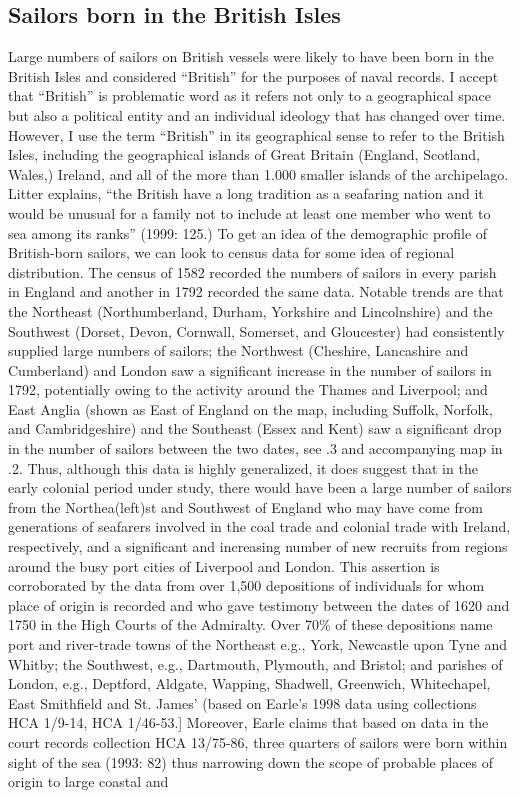 \subsection{\textbf{Sailors} \textbf{born} \textbf{in} \textbf{the} \textbf{British} \textbf{Isles} }%


Large numbers of sailors on British vessels were likely to have been born in the British Isles and considered “British” for the purposes of naval records. I accept that “British” is problematic word as it refers not only to a geographical space but also a political entity and an individual ideology that has changed over time. However, I use the term “British” in its geographical sense to refer to the British Isles, including the geographical islands of Great Britain (England, Scotland, Wales,) Ireland, and all of the more than 1.000 smaller islands of the archipelago. Litter explains, “the British have a long tradition as a seafaring nation and it would be unusual for a family not to include at least one member who went to sea among its ranks” (1999: 125.) To get an idea of the demographic profile of British-born sailors, we can look to census data for some idea of regional distribution. The census of 1582 recorded the numbers of sailors in every parish in England \citep[246]{Bicheno2012} and another in 1792 recorded the same data. Notable trends are that the Northeast (Northumberland, Durham, Yorkshire and Lincolnshire) and the Southwest (Dorset, Devon, Cornwall, Somerset, and Gloucester) had consistently supplied large numbers of sailors; the Northwest (Cheshire, Lancashire and Cumberland) and London saw a significant increase in the number of sailors in 1792, potentially owing to the activity around the Thames and Liverpool; and East Anglia (shown as East of England on the map, including Suffolk, Norfolk, and Cambridgeshire) and the Southeast (Essex and Kent) saw a significant drop in the number of sailors between the two dates, see .3 and accompanying map in .2. Thus, although this data is highly generalized, it does suggest that in the early colonial period under study, there would have been a large number of sailors from the Northea(left)st and Southwest of England who may have come from generations of seafarers involved in the coal trade and colonial trade with Ireland, respectively, and a significant and increasing number of new recruits from regions around the busy port cities of Liverpool and London. This assertion is corroborated by the data from over 1,500 depositions of individuals for whom place of origin is recorded and who gave testimony between the dates of 1620 and 1750 in the High Courts of the Admiralty. Over 70\% of these depositions name port and river-trade towns of the Northeast e.g., York, Newcastle upon Tyne and Whitby; the Southwest, e.g., Dartmouth, Plymouth, and Bristol; and parishes of London, e.g., Deptford, Aldgate, Wapping, Shadwell, Greenwich, Whitechapel, East Smithfield and St. James’ (based on Earle’s 1998 data using collections HCA 1/9-14, HCA 1/46-53.] Moreover, Earle claims that based on data in the court records collection HCA 13/75-86, three quarters of sailors were born within sight of the sea (1993: 82) thus narrowing down the scope of probable places of origin to large coastal and 
